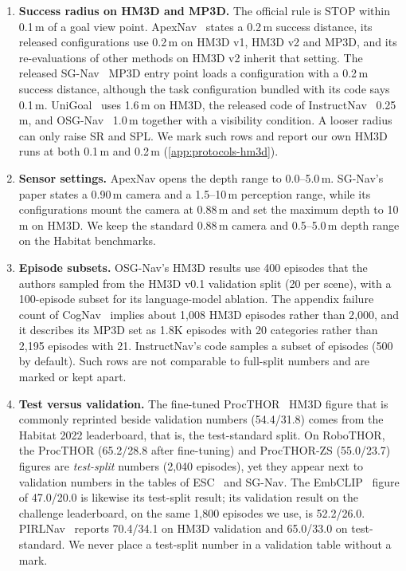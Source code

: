 \documentclass[10pt]{article}
\newcommand{\SR}{\textsc{SR}\xspace}
\newcommand{\SPL}{\textsc{SPL}\xspace}
\begin{document}
\begin{enumerate}[leftmargin=*,itemsep=2pt]
\item \textbf{Success radius on HM3D and MP3D.} The official rule is STOP within 0.1\,m of a goal view point. ApexNav~\citep{zhang2025apexnav} states a 0.2\,m success distance, its released configurations use 0.2\,m on HM3D v1, HM3D v2 and MP3D, and its re-evaluations of other methods on HM3D v2 inherit that setting. The released SG-Nav~\citep{yin2024sg} MP3D entry point loads a configuration with a 0.2\,m success distance, although the task configuration bundled with its code says 0.1\,m. UniGoal~\citep{yin2025unigoal} uses 1.6\,m on HM3D, the released code of InstructNav~\citep{long2024instructnav} 0.25\,m, and OSG-Nav~\citep{loo2025open} 1.0\,m together with a visibility condition. A looser radius can only raise \SR and \SPL. We mark such rows and report our own HM3D runs at both 0.1\,m and 0.2\,m (\cref{app:protocols-hm3d}).
\item \textbf{Sensor settings.} ApexNav opens the depth range to 0.0--5.0\,m. SG-Nav's paper states a 0.90\,m camera and a 1.5--10\,m perception range, while its configurations mount the camera at 0.88\,m and set the maximum depth to 10\,m on HM3D. We keep the standard 0.88\,m camera and 0.5--5.0\,m depth range on the Habitat benchmarks.
\item \textbf{Episode subsets.} OSG-Nav's HM3D results use 400 episodes that the authors sampled from the HM3D v0.1 validation split (20 per scene), with a 100-episode subset for its language-model ablation. The appendix failure count of CogNav~\citep{cao2025cognav} implies about 1{,}008 HM3D episodes rather than 2{,}000, and it describes its MP3D set as 1.8K episodes with 20 categories rather than 2{,}195 episodes with 21. InstructNav's code samples a subset of episodes (500 by default). Such rows are not comparable to full-split numbers and are marked or kept apart.
\item \textbf{Test versus validation.} The fine-tuned ProcTHOR~\citep{deitke2022procthor} HM3D figure that is commonly reprinted beside validation numbers (54.4/31.8) comes from the Habitat 2022 leaderboard, that is, the test-standard split. On RoboTHOR, the ProcTHOR (65.2/28.8 after fine-tuning) and ProcTHOR-ZS (55.0/23.7) figures are \emph{test-split} numbers (2{,}040 episodes), yet they appear next to validation numbers in the tables of ESC~\citep{zhou2023esc} and SG-Nav. The EmbCLIP~\citep{khandelwal2022simple} figure of 47.0/20.0 is likewise its test-split result; its validation result on the challenge leaderboard, on the same 1{,}800 episodes we use, is 52.2/26.0. PIRLNav~\citep{ramrakhya2023pirlnav} reports 70.4/34.1 on HM3D validation and 65.0/33.0 on test-standard. We never place a test-split number in a validation table without a mark.

\end{enumerate}
\end{document}
